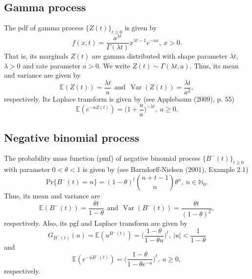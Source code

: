 \documentclass[12pt,oneside,reqno]{amsart}
\numberwithin{equation}{section}
\theoremstyle{definition}
\numberwithin{equation}{section}
\theoremstyle{remarkstyle}
\begin{document}
\subsection{Gamma process}
The pdf of gamma process $\{Z(t)\}_{t\ge 0}$ is given by
\begin{equation}\label{gamma}
	f(x,t)=\frac{a^{\lambda t}}{\Gamma(\lambda t)}x^{\lambda t-1}e^{-ax},\ x>0. 
\end{equation}
That is, its marginals $Z(t)$ are gamma distributed with shape parameter $\lambda t$, $\lambda>0$ and rate parameter $a > 0$. We write $Z(t)\sim \Gamma(\lambda t,a)$.
Thus, its mean and variance are given by
\begin{equation}\label{mean_gamma}
\mathbb{E}(Z(t))=\frac{\lambda t}{a}\ \ \text{and}\ \ \operatorname{Var}(Z(t))=\frac{\lambda t}{a^2},
\end{equation}
respectively. 
Its Laplace transform is given by (see Applebaum (2009), p. 55)
\begin{equation}\label{LT_gamma}
	\mathbb{E}(e^{-uZ(t)})=\Big(1+\frac{u}{a}\Big)^{-\lambda t},\ u\ge 0.
\end{equation}

\subsection{Negative binomial process}
The probability mass function (pmf) of negative binomial process $\{B^-(t)\}_{t\ge 0}$ with parameter $0<\theta<1$ is given by (see Barndorff-Nielsen (2001), Example 2.1)
\begin{equation}\label{negbin}
	\mathrm{Pr}\{B^-(t)=n\}= (1-\theta)^t{n+t-1 \choose n}\theta^n,\ n\in\mathbb{N}_0.
\end{equation}
Thus, its mean and variance are
\begin{equation}\label{meanvarnegbin}
\mathbb{E}(B^-(t))=\frac{\theta t}{1-\theta}\ \ \text{and}\ \ \operatorname{Var}(B^-(t))=\frac{\theta t}{(1-\theta)^2},
\end{equation}
respectively. 
Also, its pgf and Laplace transform are given by
\begin{equation}\label{pgf_negbin}
	G_{B^-(t)}(u)=\mathbb{E}(u^{B^-(t)})=\Big(\frac{1-\theta}{1-\theta u}\Big)^t,\ |u|<\frac{1}{1-\theta}
\end{equation}
and
\begin{equation*}\label{LT_negbin}
	\mathbb{E}(e^{-uB^-(t)})=\Big(\frac{1-\theta}{1-\theta e^{-u}}\Big)^t,\ u\ge 0,
\end{equation*}
respectively.
\end{document}
